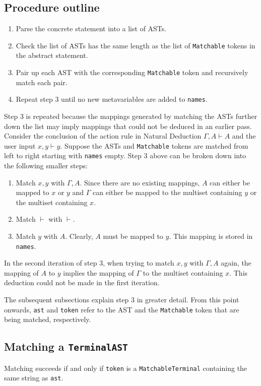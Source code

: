 \subsection{Procedure outline}
\label{matching:procedure}
\begin{enumerate}
    \item Parse the concrete statement into a list of ASTs.
    \item Check the list of ASTs has the same length as the list of \lstinline{Matchable} tokens in the abstract statement.
    \item Pair up each AST with the corresponding \lstinline{Matchable} token and recursively match each pair.
    \item Repeat step 3 until no new metavariables are added to \lstinline{names}.
\end{enumerate}
Step 3 is repeated because the mappings generated by matching the ASTs further down the list may imply mappings that could not be deduced in an earlier pass. Consider the conclusion of the action rule in Natural Deduction $\Gamma, A \vdash A$ and the user input $x, y \vdash y$. Suppose the ASTs and \lstinline{Matchable} tokens are matched from left to right starting with \lstinline{names} empty. Step 3 above can be broken down into the following smaller steps:
\begin{enumerate}
    \item Match $x, y$ with $\Gamma, A$. Since there are no existing mappings, $A$ can either be mapped to $x$ or $y$ and $\Gamma$ can either be mapped to the multiset containing $y$ or the multiset containing $x$.
    \item Match $\vdash$ with $\vdash$.
    \item Match $y$ with $A$. Clearly, $A$ must be mapped to $y$. This mapping is stored in \lstinline{names}.
\end{enumerate}
In the second iteration of step 3, when trying to match $x, y$ with $\Gamma, A$ again, the mapping of $A$ to $y$ implies the mapping of $\Gamma$ to the multiset containing $x$. This deduction could not be made in the first iteration.

The subsequent subsections explain step 3 in greater detail. From this point onwards, \lstinline{ast} and \lstinline{token} refer to the AST and the \lstinline{Matchable} token that are being matched, respectively.

\subsection{Matching a \texorpdfstring{\lstinline{TerminalAST}}{TerminalAST}}
Matching succeeds if and only if \lstinline{token} is a \lstinline{MatchableTerminal} containing the same string as \lstinline{ast}.

